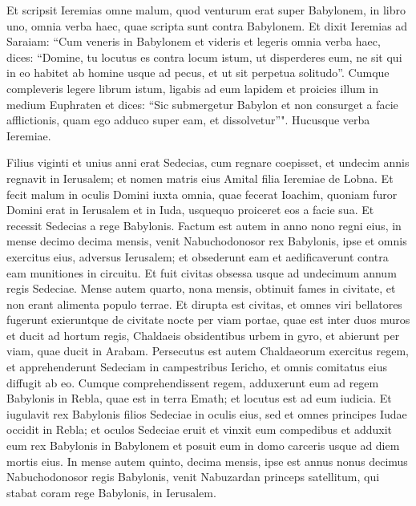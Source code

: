 \begin{biblechapter}
\verse Et scripsit Ieremias omne malum, quod venturum erat super Babylonem, in libro uno, omnia verba haec, quae scripta sunt contra Babylonem. 
\verse Et dixit Ieremias ad Saraiam: “Cum veneris in Babylonem et videris et legeris omnia verba haec,  
\verse dices: “Domine, tu locutus es contra locum istum, ut disperderes eum, ne sit qui in eo habitet ab homine usque ad pecus, et ut sit perpetua solitudo”. 
\verse Cumque compleveris legere librum istum, ligabis ad eum lapidem et proicies illum in medium Euphraten 
\verse et dices: “Sic submergetur Babylon et non consurget a facie afflictionis, quam ego adduco super eam, et dissolvetur”". Hucusque verba Ieremiae. 
\end{biblechapter}

\begin{biblechapter}  
\verse Filius viginti et unius anni erat Sedecias, cum regnare coepisset, et undecim annis regnavit in Ierusalem; et nomen matris eius Amital filia Ieremiae de Lobna. 
\verse Et fecit malum in oculis Domini iuxta omnia, quae fecerat Ioachim, 
\verse quoniam furor Domini erat in Ierusalem et in Iuda, usquequo proiceret eos a facie sua. Et recessit Sedecias a rege Babylonis. 
\verse Factum est autem in anno nono regni eius, in mense decimo decima mensis, venit Nabuchodonosor rex Babylonis, ipse et omnis exercitus eius, adversus Ierusalem; et obsederunt eam et aedificaverunt contra eam munitiones in circuitu. 
\verse Et fuit civitas obsessa usque ad undecimum annum regis Sedeciae. 
\verse Mense autem quarto, nona mensis, obtinuit fames in civitate, et non erant alimenta populo terrae. 
\verse Et dirupta est civitas, et omnes viri bellatores fugerunt exieruntque de civitate nocte per viam portae, quae est inter duos muros et ducit ad hortum regis, Chaldaeis obsidentibus urbem in gyro, et abierunt per viam, quae ducit in Arabam. 
\verse Persecutus est autem Chaldaeorum exercitus regem, et apprehenderunt Sedeciam in campestribus Iericho, et omnis comitatus eius diffugit ab eo. 
\verse Cumque comprehendissent regem, adduxerunt eum ad regem Babylonis in Rebla, quae est in terra Emath; et locutus est ad eum iudicia. 
\verse Et iugulavit rex Babylonis filios Sedeciae in oculis eius, sed et omnes principes Iudae occidit in Rebla;  
\verse et oculos Sedeciae eruit et vinxit eum compedibus et adduxit eum rex Babylonis in Babylonem et posuit eum in domo carceris usque ad diem mortis eius. 
\verse In mense autem quinto, decima mensis, ipse est annus nonus decimus Nabuchodonosor regis Babylonis, venit Nabuzardan princeps satellitum, qui stabat coram rege Babylonis, in Ierusalem. 

\end{biblechapter}
